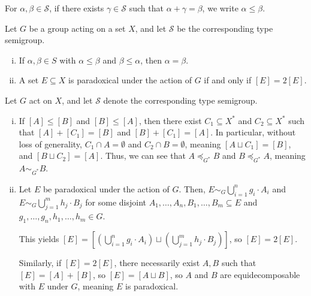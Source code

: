 \documentclass[10pt]{mypackage}
\begin{document}
  \begin{definition}
    For $\alpha,\beta \in \mathcal{S}$, if there exists $\gamma \in \mathcal{S}$ such that $\alpha + \gamma = \beta$, we write $\alpha \leq \beta$.
  \end{definition}
  \begin{exercise}
    Let $G$ be a group acting on a set $X$, and let $\mathcal{S}$ be the corresponding type semigroup.
    \begin{enumerate}[(i)]
      \item If $\alpha,\beta \in S$ with $\alpha \leq \beta$ and $\beta \leq \alpha$, then $\alpha = \beta$.
      \item A set $E\subseteq X$ is paradoxical under the action of $G$ if and only if $[E] = 2[E]$.
    \end{enumerate}
  \end{exercise}
  \begin{solution}
    Let $G$ act on $X$, and let $\mathcal{S}$ denote the corresponding type semigroup.
    \begin{enumerate}[(i)]
      \item If $\left[A\right] \leq \left[B\right]$ and $\left[B\right] \leq \left[A\right]$, then there exist $C_1\subseteq X^{\ast}$ and $C_2\subseteq X^{\ast}$ such that $\left[A\right] + \left[C_1\right] = \left[B\right]$ and $\left[B\right] + \left[C_1\right] = \left[A\right]$. In particular, without loss of generality, $C_1 \cap A = \emptyset$ and $C_2\cap B = \emptyset$, meaning $\left[A\sqcup C_1\right] = \left[B\right]$, and $\left[B\sqcup C_2\right] = \left[A\right]$. Thus, we can see that $A\preceq_{G^{\ast}} B$ and $B\preceq_{G^{\ast}}A$, meaning $A\sim_{G^{\ast}} B$.
      \item Let $E$ be paradoxical under the action of $G$. Then, $E\sim_{G} \bigcup_{i=1}^{n}g_i\cdot A_i$ and $E\sim_{G}\bigcup_{j=1}^{m}h_j\cdot B_j$ for some disjoint $A_1,\dots,A_n,B_1,\dots,B_m\subseteq E$ and $g_1,\dots,g_n,h_1,\dots,h_m\in G$.\newline

        This yields $\left[E\right] = \left[\left(\bigcup_{i=1}^{n}g_i\cdot A_i\right) \sqcup \left(\bigcup_{j=1}^{m}h_j\cdot B_j\right)\right]$, so $\left[E\right] = 2\left[E\right]$.\newline

        Similarly, if $\left[E\right] = 2\left[E\right]$, there necessarily exist $A,B$ such that $\left[E\right] = \left[A\right] + \left[B\right]$, so $\left[E\right] = \left[A\sqcup B\right]$, so $A$ and $B$ are equidecomposable with $E$ under $G$, meaning $E$ is paradoxical.
    \end{enumerate}
  \end{solution}
\end{document}
